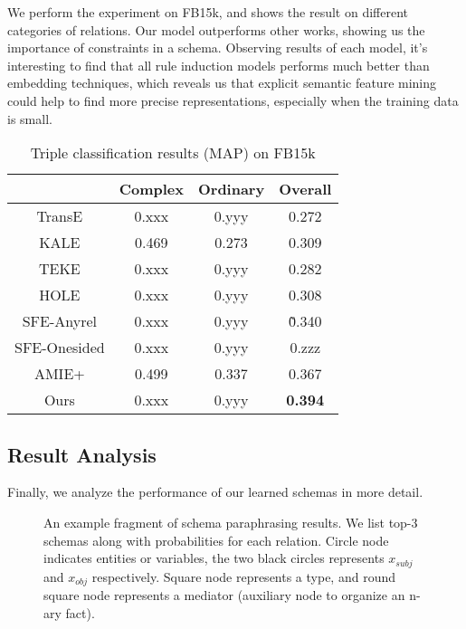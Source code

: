 We perform the experiment on FB15k, and  shows the result on
different categories of relations.
Our model outperforms other works, showing us the importance of constraints in a schema.
Observing results of each model, it's interesting to find that all rule induction models
performs much better than embedding techniques, which reveals us that
explicit semantic feature mining could help to find more precise representations,
especially when the training data is small.

\begin{table}[ht]
	\small
	\centering
	\caption{Triple classification results (MAP) on FB15k}
	\begin{tabular}{|c|ccc|}
		\hline
							& Complex	& Ordinary & Overall 	\\
        \hline
		TransE				&	0.xxx	&	0.yyy	&	0.272	\\
		KALE				&	0.469	&	0.273	&	0.309	\\
		TEKE				&	0.xxx	&	0.yyy	&	0.282	\\
		HOLE				&	0.xxx	&	0.yyy	&	0.308	\\
		\hline
		SFE-Anyrel			&	0.xxx	&	0.yyy	&	\~0.340	\\
		SFE-Onesided		&	0.xxx	&	0.yyy	&	0.zzz	\\
		AMIE+				&	0.499	&	0.337	&	0.367	\\
		Ours				&	0.xxx	&	0.yyy	&	\textbf{0.394}	\\
		\hline
	\end{tabular}
	\label{tab:triple-clsf}
\end{table}



\subsection{Result Analysis}
Finally, we analyze the performance of our learned schemas in more detail.

\begin{figure*}[th]
\centering
\caption{An example fragment of schema paraphrasing results.
We list top-3 schemas along with probabilities for each relation.
Circle node indicates entities or variables, the two black circles represents
$x_{subj}$ and $x_{obj}$ respectively. Square node represents a type, and
round square node represents a mediator (auxiliary node to organize an n-ary fact).}
\label{fig:relation-example}
\end{figure*}

